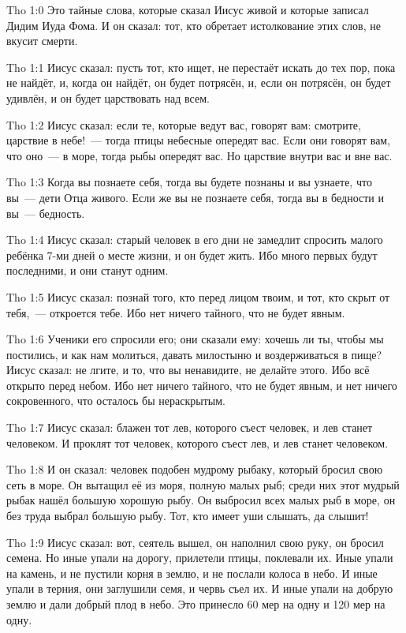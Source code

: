 
\vs Tho 1:0
Это тайные слова,
которые сказал Иисус живой
и которые записал Дидим Иуда Фома.
И он сказал:
тот, кто обретает истолкование этих слов, не вкусит смерти.

\vs Tho 1:1
Иисус сказал: пусть тот, кто ищет,
не перестаёт искать до тех пор, пока не найдёт,
и, когда он найдёт, он будет потрясён,
и, если он потрясён, он будет удивлён,
и он будет царствовать над всем.

\vs Tho 1:2
Иисус сказал: если те, которые ведут вас, говорят вам:
смотрите, царствие в небе!~--- тогда птицы небесные
опередят вас.
Если они говорят вам, что оно~--- в море,
тогда рыбы опередят вас.
Но царствие внутри вас и вне вас.

\vs Tho 1:3
Когда вы познаете себя,
тогда вы будете познаны и вы узнаете,
что вы~--- дети Отца живого.
Если же вы не познаете себя,
тогда вы в бедности и вы~--- бедность.

\vs Tho 1:4
Иисус сказал: старый человек в его дни
не замедлит спросить малого ребёнка 7-ми дней о месте жизни,
и он будет жить.
Ибо много первых будут последними, и они станут одним.

\vs Tho 1:5
Иисус сказал: познай того, кто перед лицом твоим,
и тот, кто скрыт от тебя,~--- откроется тебе.
Ибо нет ничего тайного, что не будет явным.

\vs Tho 1:6
Ученики его спросили его;
они сказали ему: хочешь ли ты, чтобы мы постились,
и как нам молиться, давать милостыню и воздерживаться в пище?
Иисус сказал: не лгите, и то, что вы ненавидите, не делайте этого.
Ибо всё открыто перед небом.
Ибо нет ничего тайного, что не будет явным,
и нет ничего сокровенного, что осталось бы нераскрытым.

\vs Tho 1:7
Иисус сказал: блажен тот лев, которого съест человек,
и лев станет человеком.
И проклят тот человек, которого съест лев, и лев станет человеком.

\vs Tho 1:8
И он сказал: человек подобен мудрому рыбаку,
который бросил свою сеть в море.
Он вытащил её из моря, полную малых рыб;
среди них этот мудрый рыбак нашёл большую хорошую рыбу.
Он выбросил всех малых рыб в море, он без труда выбрал большую рыбу.
Тот, кто имеет уши слышать, да слышит!

\vs Tho 1:9
Иисус сказал:
вот, сеятель вышел, он наполнил свою руку, он бросил семена.
Но иные упали на дорогу, прилетели птицы, поклевали их.
Иные упали на камень, и не пустили корня в землю,
и не послали колоса в небо.
И иные упали в терния, они заглушили семя, и червь съел их.
И иные упали на добрую землю и дали добрый плод в небо.
Это принесло 60 мер на одну и 120 мер на одну.

